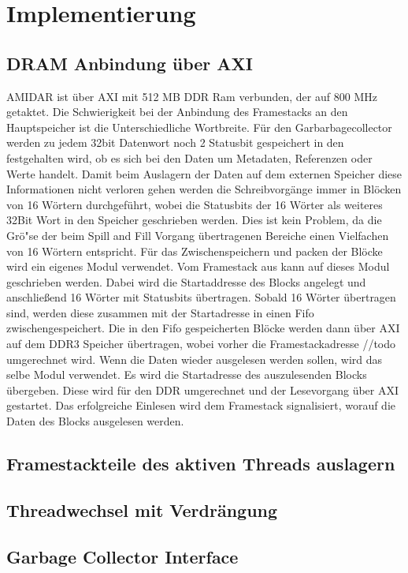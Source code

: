 \chapter{Implementierung}
\label{cha:Implementierung}
\section{DRAM Anbindung \"uber AXI}
AMIDAR ist \"uber AXI mit 512 MB DDR Ram verbunden, der auf 800 MHz getaktet.
Die Schwierigkeit bei der Anbindung des Framestacks an den Hauptspeicher ist die Unterschiedliche Wortbreite. 
F\"ur den Garbarbagecollector werden zu jedem 32bit Datenwort noch 2 Statusbit gespeichert in den festgehalten wird, ob es sich bei den Daten um Metadaten, Referenzen oder Werte handelt. Damit beim Auslagern der Daten auf dem externen Speicher diese Informationen nicht verloren gehen werden die Schreibvorg\"ange immer in Bl\"ocken von 16 W\"ortern durchgef\"uhrt, wobei die Statusbits der 16 W\"orter als weiteres 32Bit Wort in den Speicher geschrieben werden. Dies ist kein Problem, da die Gr\"o"se der beim Spill and Fill Vorgang \"ubertragenen Bereiche einen Vielfachen von 16 W\"ortern entspricht. 
F\"ur das Zwischenspeichern und packen der Bl\"ocke wird ein eigenes Modul verwendet.
Vom Framestack aus kann auf dieses Modul geschrieben werden. Dabei wird die Startaddresse des Blocks angelegt und anschließend 16 W\"orter mit Statusbits \"ubertragen. Sobald 16 W\"orter \"ubertragen sind, werden diese zusammen mit der Startadresse in einen Fifo zwischengespeichert. Die in den Fifo gespeicherten Bl\"ocke werden dann \"uber AXI auf dem DDR3 Speicher \"ubertragen, wobei vorher die Framestackadresse //todo umgerechnet wird. 
Wenn die Daten wieder ausgelesen werden sollen, wird das selbe Modul verwendet. Es wird die Startadresse des auszulesenden Blocks \"ubergeben. Diese wird f\"ur den DDR umgerechnet und der Lesevorgang \"uber AXI gestartet. Das erfolgreiche Einlesen wird dem Framestack signalisiert, worauf die Daten des Blocks ausgelesen werden. 

\section{Framestackteile des aktiven Threads auslagern}

\section{Threadwechsel mit Verdr\"angung}
\section{Garbage Collector Interface}